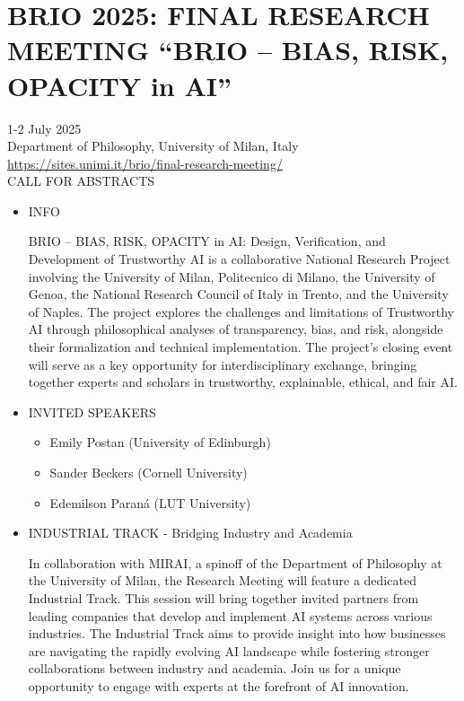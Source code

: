 \documentclass[prodmode,acmtecs]{acmsmall} %
\begin{document}
\section{BRIO 2025: FINAL RESEARCH MEETING   “BRIO – BIAS, RISK, OPACITY in AI”}\label{BRIO2025}  1-2 July 2025\\ 
  Department of Philosophy, University of Milan, Italy \\ 
  \href{https://sites.unimi.it/brio/final-research-meeting/}{https://sites.unimi.it/brio/final-research-meeting/}\\ 
CALL FOR ABSTRACTS  

\begin{itemize}\item  INFO  
 
  BRIO – BIAS, RISK, OPACITY in AI: Design, Verification, and Development of Trustworthy AI is a collaborative National Research Project involving the University of Milan, Politecnico di Milano, the University of Genoa, the National Research Council of Italy in Trento, and the University of Naples. The project explores the challenges and limitations of Trustworthy AI through philosophical analyses of transparency, bias, and risk, alongside their formalization and technical implementation. The project's closing event will serve as a key opportunity for interdisciplinary exchange, bringing together experts and scholars in trustworthy, explainable, ethical, and fair AI.   
 
\item  INVITED SPEAKERS  
 
\begin{itemize}\item  Emily Postan (University of Edinburgh) 
\item  Sander Beckers (Cornell University) 
\item  Edemilson Paraná (LUT University) 
\end{itemize} 
\item  INDUSTRIAL TRACK - Bridging Industry and Academia  
 
   In collaboration with MIRAI, a spinoff of the Department of Philosophy at the University of Milan, the Research Meeting will feature a dedicated Industrial Track. This session will bring together invited partners from leading companies that develop and implement AI systems across various industries. The Industrial Track aims to provide insight into how businesses are navigating the rapidly evolving AI landscape while fostering stronger collaborations between industry and academia. Join us for a unique opportunity to engage with experts at the forefront of AI innovation.  
 

\end{itemize}
\end{document}

